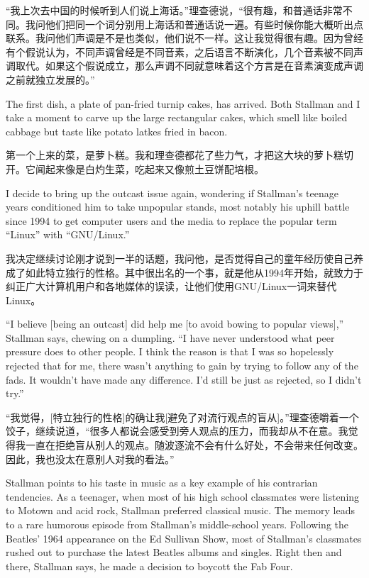 \ifdefined\chs
“我上次去中国的时候听到人们说上海话。”理查德说，“很有趣，和普通话非常不同。我问他们把同一个词分别用上海话和普通话说一遍。有些时候你能大概听出点联系。我问他们声调是不是也类似，他们说不一样。这让我觉得很有趣。因为曾经有个假说认为，不同声调曾经是不同音素，之后语言不断演化，几个音素被不同声调取代。如果这个假说成立，那么声调不同就意味着这个方言是在音素演变成声调之前就独立发展的。”
\fi

\ifdefined\eng
The first dish, a plate of pan-fried turnip cakes, has arrived. Both Stallman and I take a moment to carve up the large rectangular cakes, which smell like boiled cabbage but taste like potato latkes fried in bacon.
\fi

\ifdefined\chs
第一个上来的菜，是萝卜糕。我和理查德都花了些力气，才把这大块的萝卜糕切开。它闻起来像是白灼生菜，吃起来又像煎土豆饼配培根。
\fi

\ifdefined\eng
I decide to bring up the outcast issue again, wondering if Stallman's teenage years conditioned him to take unpopular stands, most notably his uphill battle since 1994 to get computer users and the media to replace the popular term ``Linux'' with ``GNU/Linux.''
\fi

\ifdefined\chs
我决定继续讨论刚才说到一半的话题，我问他，是否觉得自己的童年经历使自己养成了如此特立独行的性格。其中很出名的一个事，就是他从1994年开始，就致力于纠正广大计算机用户和各地媒体的误读，让他们使用GNU/Linux一词来替代Linux。
\fi

\ifdefined\eng
``I believe [being an outcast] did help me [to avoid bowing to popular views],'' Stallman says, chewing on a dumpling. ``I have never understood what peer pressure does to other people. I think the reason is that I was so hopelessly rejected that for me, there wasn't anything to gain by trying to follow any of the fads. It wouldn't have made any difference. I'd still be just as rejected, so I didn't try.''
\fi

\ifdefined\chs
“我觉得，[特立独行的性格]的确让我[避免了对流行观点的盲从]。”理查德嚼着一个饺子，继续说道，“很多人都说会感受到旁人观点的压力，而我却从不在意。我觉得我一直在拒绝盲从别人的观点。随波逐流不会有什么好处，不会带来任何改变。因此，我也没太在意别人对我的看法。”
\fi

\ifdefined\eng
Stallman points to his taste in music as a key example of his contrarian tendencies. As a teenager, when most of his high school classmates were listening to Motown and acid rock, Stallman preferred classical music. The memory leads to a rare humorous episode from Stallman's middle-school years. Following the Beatles' 1964 appearance on the Ed Sullivan Show, most of Stallman's classmates rushed out to purchase the latest Beatles albums and singles. Right then and there, Stallman says, he made a decision to boycott the Fab Four.
\fi

